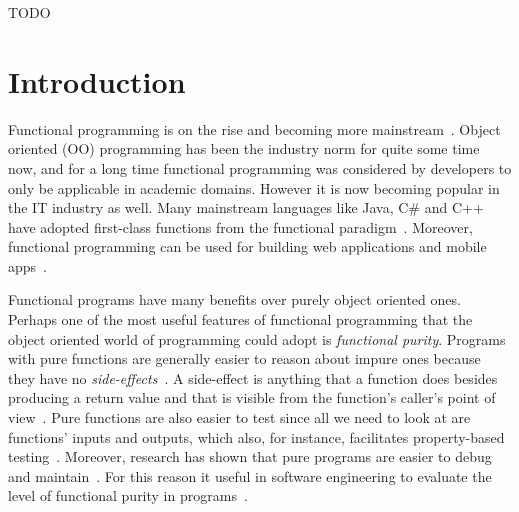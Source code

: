 \documentclass[a4paper,12pt]{article}
\begin{document}
\begin{sammanfattning}
  TODO
\end{sammanfattning}

\tableofcontents


\cleardoublepage

\mainmatter

\section{Introduction} \label{sec:Introduction}


Functional programming is on the rise and becoming more mainstream~\cite{intertech}. Object oriented (OO) programming has been the industry norm for quite some time now, and for a long time functional programming was considered by developers to only be applicable in academic domains. However it is now becoming popular in the IT industry as well. Many mainstream languages like Java, C\# and C++ have adopted first-class functions from the functional paradigm~\cite{intertech}. Moreover, functional programming can be used for building web applications and mobile apps~\cite{jonas-walter}.

Functional programs have many benefits over purely object oriented ones. Perhaps one of the most useful features of functional programming that the object oriented world of programming could adopt is \textit{functional purity}. Programs with pure functions are generally easier to reason about impure ones because they have no \textit{side-effects}~\cite{alvin-alexander}. A side-effect is anything that a function does besides producing a return value and that is visible from the function's caller's point of view~\cite{purity-in-javascript}. Pure functions are also easier to test since all we need to look at are functions' inputs and outputs, which also, for instance, facilitates property-based testing~\cite{alvin-alexander}. Moreover, research has shown that pure programs are easier to debug and maintain~\cite{purity-in-javascript}. %
For this reason it useful in software engineering to evaluate the level of functional purity in programs~\cite{purity-in-javascript}.
\end{document}

